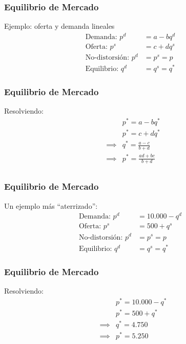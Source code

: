 \documentclass[dvipsnames,table,leqno]{beamer}
\newcommand{\peq}[1]{{\scriptscriptstyle{#1}}}
\begin{document}
		\begin{frame}
			\frametitle{Equilibrio de Mercado}
			Ejemplo: oferta y demanda lineales
				\begin{align}
					\text{Demanda: } p^\peq{d}&=a-bq^\peq{d}& \\
					\text{Oferta: }  p^\peq{s}&=c+dq^\peq{s}& \\
					\text{No-distorsión: } p^\peq{d}&=p^\peq{s}=p& \\
					\text{Equilibrio: } q^\peq{d}&=q^\peq{s}=q^\peq{*}&
				\end{align}
		\end{frame}
	
		\begin{frame}
			\frametitle{Equilibrio de Mercado}
			Resolviendo:
				\begin{align*}
					&p^\peq{*}=a-bq^\peq{*} \\
					&p^\peq{*}=c+dq^\peq{*} \\
					\implies &q^\peq{*}=\frac{a-c}{b+d} \\
					\implies &p^\peq{*}=\frac{ad+bc}{b+d} \\
				\end{align*}
		\end{frame}

		\begin{frame}
			\frametitle{Equilibrio de Mercado}
			Un ejemplo más ``aterrizado'': 
				\begin{align}
					\text{Demanda: } p^\peq{d}&=10.000-q^\peq{d}& \\
					\text{Oferta: }  p^\peq{s}&=500+q^\peq{s}& \\
					\text{No-distorsión: } p^\peq{d}&=p^\peq{s}=p& \\
					\text{Equilibrio: } q^\peq{d}&=q^\peq{s}=q^\peq{*}&
				\end{align}
		\end{frame}
	
		\begin{frame}
			\frametitle{Equilibrio de Mercado}
			Resolviendo:
				\begin{align*}
					&p^\peq{*}=10.000-q^\peq{*} \\
					&p^\peq{*}=500+q^\peq{*} \\
					\implies  &q^\peq{*}=4.750 \\
					\implies  &p^\peq{*}=5.250 \\
				\end{align*}
		\end{frame}
\end{document}
